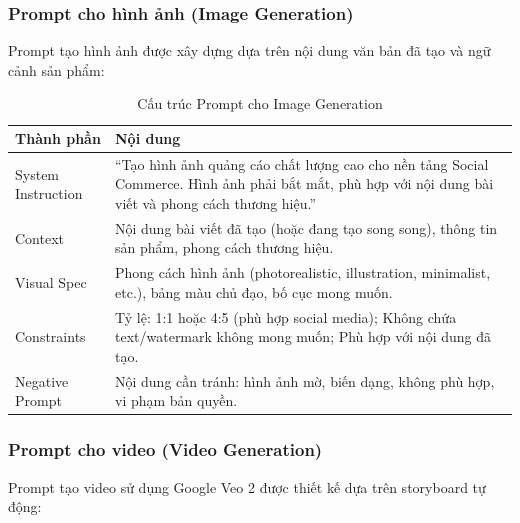 \subsubsection{Prompt cho hình ảnh (Image Generation)}

Prompt tạo hình ảnh được xây dựng dựa trên nội dung văn bản đã tạo và ngữ cảnh sản phẩm:

\begin{table}[H]
\centering
\renewcommand{\arraystretch}{1.3}
\begin{tabularx}{\textwidth}{|l|X|}
\hline
\textbf{Thành phần} & \textbf{Nội dung} \\ \hline
System Instruction & ``Tạo hình ảnh quảng cáo chất lượng cao cho nền tảng Social Commerce. Hình ảnh phải bắt mắt, phù hợp với nội dung bài viết và phong cách thương hiệu.'' \\ \hline
Context & Nội dung bài viết đã tạo (hoặc đang tạo song song), thông tin sản phẩm, phong cách thương hiệu. \\ \hline
Visual Spec & Phong cách hình ảnh (photorealistic, illustration, minimalist, etc.), bảng màu chủ đạo, bố cục mong muốn. \\ \hline
Constraints & Tỷ lệ: 1:1 hoặc 4:5 (phù hợp social media); Không chứa text/watermark không mong muốn; Phù hợp với nội dung đã tạo. \\ \hline
Negative Prompt & Nội dung cần tránh: hình ảnh mờ, biến dạng, không phù hợp, vi phạm bản quyền. \\ \hline
\end{tabularx}
\caption{Cấu trúc Prompt cho Image Generation}
\label{tab:prompt-image}
\end{table}

\subsubsection{Prompt cho video (Video Generation)}

Prompt tạo video sử dụng Google Veo 2 được thiết kế dựa trên storyboard tự động:

